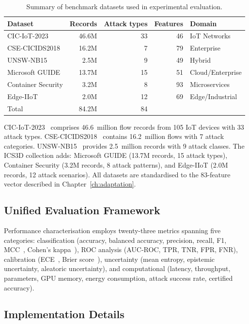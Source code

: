 \begin{table}[htbp]
\centering
\caption{Summary of benchmark datasets used in experimental evaluation.}
\label{tab:datasets}
\begin{tabular}{lrrrl}
\toprule
Dataset & Records & Attack types & Features & Domain \\
\midrule
CIC-IoT-2023      & 46.6M & 33 & 46 & IoT Networks \\
CSE-CICIDS2018     & 16.2M &  7 & 79 & Enterprise \\
UNSW-NB15          &  2.5M &  9 & 49 & Hybrid \\
Microsoft GUIDE    & 13.7M & 15 & 51 & Cloud/Enterprise \\
Container Security &  3.2M &  8 & 93 & Microservices \\
Edge-IIoT          &  2.0M & 12 & 69 & Edge/Industrial \\
\midrule
Total              & 84.2M & 84 &    & \\
\bottomrule
\end{tabular}
\end{table}

CIC-IoT-2023~\cite{Neto2023,Ring2019} comprises 46.6~million flow records from 105 IoT devices with 33 attack types. CSE-CICIDS2018~\cite{Sharafaldin2018} contains 16.2~million flows with 7 attack categories. UNSW-NB15~\cite{Moustafa2015,Mirsky2018} provides 2.5~million records with 9 attack classes. The ICS3D collection adds: Microsoft GUIDE (13.7M records, 15 attack types), Container Security (3.2M records, 8 attack patterns), and Edge-IIoT (2.0M records, 12 attack scenarios). All datasets are standardised to the 83-feature vector described in Chapter~\ref{ch:adaptation}.


\subsection{Unified Evaluation Framework}

Performance characterisation employs twenty-three metrics spanning five categories: classification (accuracy, balanced accuracy, precision, recall, F1, MCC~\cite{Matthews1975}, Cohen's kappa~\cite{Cohen1960}), ROC analysis (AUC-ROC, TPR, TNR, FPR, FNR), calibration (ECE~\cite{Naeini2015}, Brier score~\cite{Brier1950}), uncertainty (mean entropy, epistemic uncertainty, aleatoric uncertainty), and computational (latency, throughput, parameters, GPU memory, energy consumption, attack success rate, certified accuracy).


\subsection{Implementation Details}

